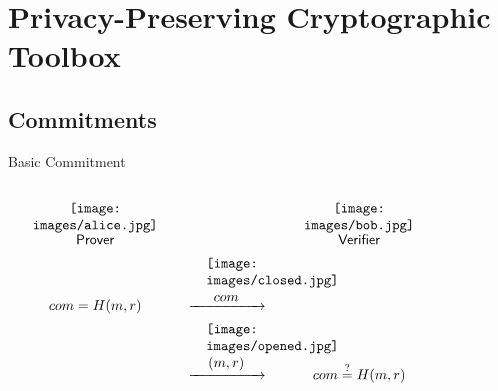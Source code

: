 
    \section{Privacy-Preserving Cryptographic Toolbox}
     \frame{\sectionpage}

     \subsection{Commitments}
     
 \begin{frame}{Basic Commitment}
 
  {
  
  $
    \begin{array}{c c c}
&&\\
         
\begin{minipage}{4cm}
\begin{center}
 \texttt{[image: images/alice.jpg]}
 \end{center}
\end{minipage}
&&
     
\begin{minipage}{4cm}
\begin{center}
 \texttt{[image: images/bob.jpg]}
 \end{center}
\end{minipage}
\\
\text{\textsf{Prover}} & & \text{\textsf{Verifier}} \\
com = H(m,r) &  \xrightarrow{\hspace{1em}
\begin{minipage}{1cm}
\begin{center}
 \texttt{[image: images/closed.jpg]}
 \vspace{0.05cm} $com$
 \end{center} 
\end{minipage}  \hspace{1em}} & \\

 & \xrightarrow{\hspace{1em}
\begin{minipage}{1cm}
\begin{center}
 \texttt{[image: images/opened.jpg]}
 \vspace{0.05cm} $(m,r)$
 \end{center} 
\end{minipage}  \hspace{1em}} &  com \stackrel{?}{=}H(m,r)

\end{array}$
  }

\end{frame}
